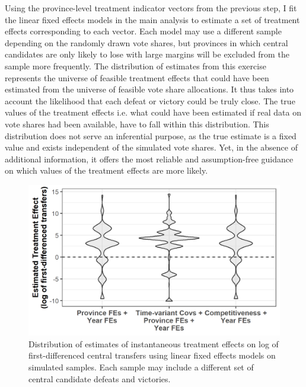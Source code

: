 \documentclass[12pt]{article}
\newcommand{\1}{\mathbbm{1}}
\begin{document}
Using the province-level treatment indicator vectors from the previous step, I fit the linear fixed effects models in the main analysis to estimate a set of treatment effects corresponding to each vector. Each model may use a different sample depending on the randomly drawn vote shares, but provinces in which central candidates are only likely to lose with large margins will be excluded from the sample more frequently. The distribution of estimates from this exercise represents the universe of feasible treatment effects that could have been estimated from the universe of feasible vote share allocations. It thus takes into account the likelihood that each defeat or victory could be truly close. The true values of the treatment effects i.e. what could have been estimated if real data on vote shares had been available, have to fall within this distribution. This distribution does not serve an inferential purpose, as the true estimate is a fixed value and exists independent of the simulated vote shares. %
Yet, in the absence of additional information, it offers the most reliable and assumption-free guidance on which values of the treatment effects are more likely.

\begin{figure}[!htbp]
	\centering
	\includegraphics[]{figure/210202_impute_results_2011.png}
	\captionsetup{singlelinecheck=off}
	\caption[Estimated linear fixed effects treatment effects using simulated vote shares]{Distribution of estimates of instantaneous treatment effects on log of first-differenced central transfers using linear fixed effects models on simulated samples. Each sample may include a different set of central candidate defeats and victories.}
	\label{fig:impute_results_2011}
\end{figure}
\end{document}
